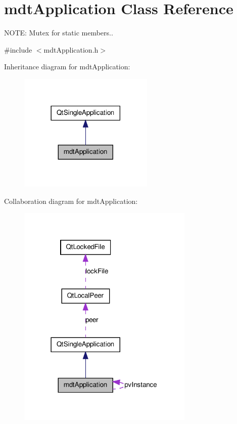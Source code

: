 \hypertarget{classmdt_application}{
\section{mdtApplication Class Reference}
\label{classmdt_application}
}


NOTE: Mutex for static members..  




{\ttfamily \#include $<$mdtApplication.h$>$}



Inheritance diagram for mdtApplication:\nopagebreak
\begin{figure}[H]
\begin{center}
\leavevmode
\includegraphics[width=182pt]{classmdt_application__inherit__graph}
\end{center}
\end{figure}


Collaboration diagram for mdtApplication:
\nopagebreak
\begin{figure}[H]
\begin{center}
\leavevmode
\includegraphics[width=238pt]{classmdt_application__coll__graph}
\end{center}
\end{figure}
